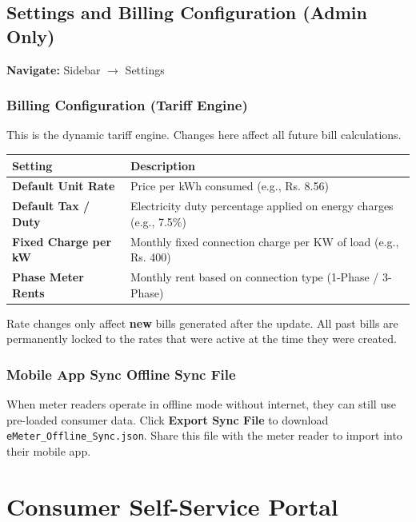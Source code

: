 \documentclass[12pt, a4paper]{report}
\begin{document}
\section{Settings and Billing Configuration (Admin Only)}

\textbf{Navigate:} Sidebar $\rightarrow$ Settings

\subsection{Billing Configuration (Tariff Engine)}
This is the dynamic tariff engine. Changes here affect all future bill calculations.

\begin{table}[H]
\centering
\begin{tabularx}{\textwidth}{>{\bfseries}l X}
\toprule
Setting & Description \\
\midrule
Default Unit Rate & Price per kWh consumed (e.g., Rs. 8.56) \\
Default Tax / Duty & Electricity duty percentage applied on energy charges (e.g., 7.5\%) \\
Fixed Charge per kW & Monthly fixed connection charge per KW of load (e.g., Rs. 400) \\
Phase Meter Rents & Monthly rent based on connection type (1-Phase / 3-Phase) \\
\bottomrule
\end{tabularx}
\end{table}

\begin{warningbox}
Rate changes only affect \textbf{new} bills generated after the update. All past bills are permanently locked to the rates that were active at the time they were created.
\end{warningbox}

\subsection{Mobile App Sync Offline Sync File}
When meter readers operate in offline mode without internet, they can still use pre-loaded consumer data. Click \textbf{Export Sync File} to download \texttt{eMeter\_Offline\_Sync.json}. Share this file with the meter reader to import into their mobile app.

\chapter{Consumer Self-Service Portal}
\end{document}
